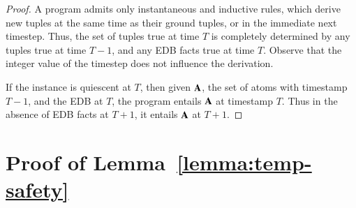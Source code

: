 \begin{proof}
A \slang program admits only instantaneous and inductive rules, which derive
new tuples at the same time as their ground tuples, or in the immediate next
timestep.  Thus, the set of tuples true at time $T$ is completely determined by
any tuples true at time $T-1$, and any EDB facts true at time $T$.  Observe
that the integer value of the timestep does not influence the derivation.

If the instance is quiescent at $T$, then given ${\bf A}$, the set of atoms
with timestamp $T-1$, and the EDB at $T$, the program entails ${\bf
A}$ at timestamp $T$.  Thus in the absence of EDB facts at $T+1$, it entails
${\bf A}$ at $T+1$.
%
\end{proof}



\section{Proof of Lemma~\ref{lemma:temp-safety}}





